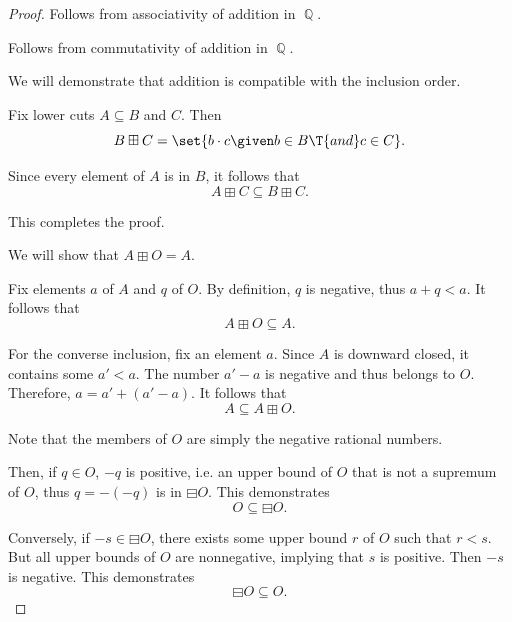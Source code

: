 \begin{proof}
   Follows from associativity of addition in \( \BbbQ \).

   Follows from commutativity of addition in \( \BbbQ \).

   We will demonstrate that addition is compatible with the inclusion order.

  Fix lower cuts \( A \subseteq B \) and \( C \). Then
  \begin{equation*}
    B \boxplus C = \set{ b \cdot c \given b \in B \T{and} c \in C }.
  \end{equation*}

  Since every element of \( A \) is in \( B \), it follows that
  \begin{equation*}
    A \boxplus C \subseteq B \boxplus C.
  \end{equation*}

  This completes the proof.

   We will show that \( A \boxplus O = A \).

  Fix elements \( a \) of \( A \) and \( q \) of \( O \). By definition, \( q \) is negative, thus \( a + q < a \). It follows that
  \begin{equation*}
    A \boxplus O \subseteq A.
  \end{equation*}

  For the converse inclusion, fix an element \( a \). Since \( A \) is downward closed, it contains some \( a' < a \). The number \( a' - a \) is negative and thus belongs to \( O \). Therefore, \( a = a' + (a' - a) \). It follows that
  \begin{equation*}
    A \subseteq A \boxplus O.
  \end{equation*}

   Note that the members of \( O \) are simply the negative rational numbers.

  Then, if \( q \in O \), \( -q \) is positive, i.e. an upper bound of \( O \) that is not a supremum of \( O \), thus \( q = -(-q) \) is in \( \boxminus O \). This demonstrates
  \begin{equation*}
    O \subseteq \boxminus O.
  \end{equation*}

  Conversely, if \( -s \in \boxminus O \), there exists some upper bound \( r \) of \( O \) such that \( r < s \). But all upper bounds of \( O \) are nonnegative, implying that \( s \) is positive. Then \( -s \) is negative. This demonstrates
  \begin{equation*}
    \boxminus O \subseteq O.
  \end{equation*}


\end{proof}
